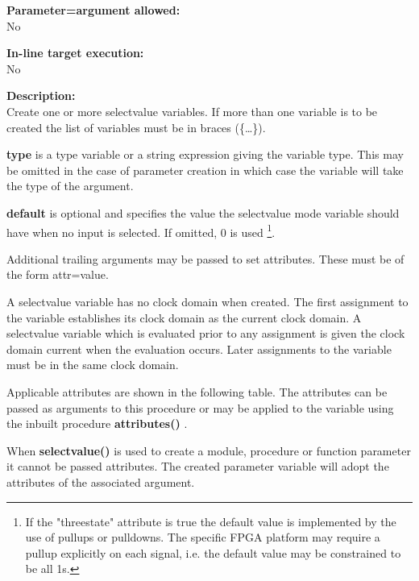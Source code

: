        {\bf Parameter=argument allowed:} \\
        No
        
        {\bf In-line target execution:} \\
        No
        
        {\bf Description:} \\
        Create one or more selectvalue variables. If more than one variable is to
        be created the list of variables must be in braces (\{\dots\}).
        
        {\bf type} is a type variable or a string expression giving the variable
        type. This may be omitted in the case of parameter creation in which case
        the variable will take the type of the argument.
        
        {\bf default} is optional and specifies the value the selectvalue mode
        variable should have when no input is selected. If omitted, 0 is used
        \footnote{If the "threestate" attribute is true the default value is
        implemented by the use of pullups or pulldowns. The specific FPGA
        platform may require a pullup explicitly on each signal, i.e. the
        default value may be constrained to be all 1s.}.
        
        Additional trailing arguments may be passed to set attributes. These
        must be of the form attr=value.
        
        A selectvalue variable has no clock domain when created. The first
        assignment to the variable establishes its clock domain as the current
        clock domain. A selectvalue variable which is evaluated prior to any
        assignment is given the clock domain current when the evaluation occurs.
        Later assignments to the variable must be in the same clock domain.
        
        Applicable attributes are shown in the following table. The
        attributes can be passed as arguments to this procedure or may be
        applied to the variable using the inbuilt procedure
        {\bf attributes()} .
        
        When {\bf selectvalue()} is used to create a module, procedure or function
        parameter it cannot be passed attributes. The created parameter variable
        will adopt the attributes of the associated argument.

        




